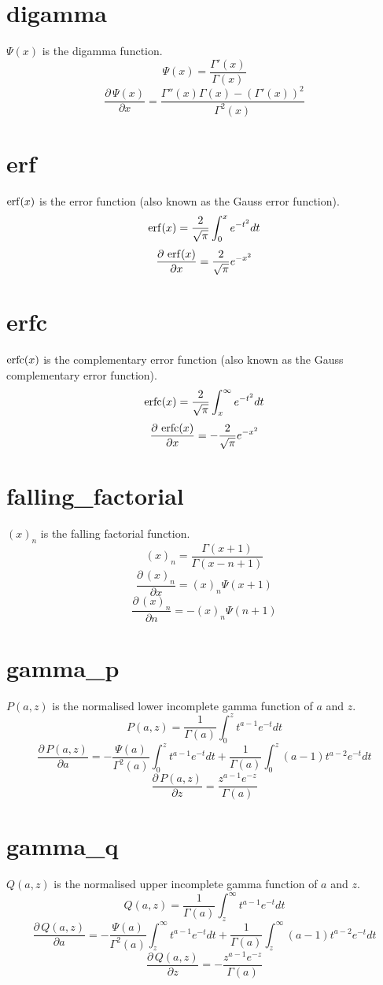 \section{digamma}\label{digamma-appendix.section}
$\Psi(x)$ is the digamma function.
%
\[
\Psi(x)=\frac{\Gamma'(x)}{\Gamma(x)}
\]
%
\[
\frac{\partial \, \Psi(x)}{\partial x} = \frac{\Gamma''(x)\Gamma(x)-(\Gamma'(x))^2}{\Gamma^2(x)}
\]

\section{erf}\label{erf-appendix.section}
$\erf(x)$ is the error function (also known as the Gauss error function).
%
\[
\erf(x)=\frac{2}{\sqrt{\pi}}\int_0^x e^{-t^2}dt
\]
%
\[
\frac{\partial \, \erf(x)}{\partial x} = \frac{2}{\sqrt{\pi}} e^{-x^2}
\]

\section{erfc}\label{erfc-appendix.section}
$\erfc(x)$ is the complementary error function (also known as the Gauss complementary error function).
%
\[
\erfc(x)=\frac{2}{\sqrt{\pi}}\int_x^\infty e^{-t^2}dt
\]
%
\[
\frac{\partial \, \erfc(x)}{\partial x} = -\frac{2}{\sqrt{\pi}} e^{-x^2}
\]

\section{falling\_factorial}\label{falling-factorial-appendix.section}
$(x)_n$ is the falling factorial function.
%
\[
(x)_n=\frac{\Gamma(x+1)}{\Gamma(x-n+1)}
\]
%
\[
\frac{\partial \, (x)_n}{\partial x} = (x)_n\Psi(x+1)
\]
%
\[
\frac{\partial \, (x)_n}{\partial n} = -(x)_n\Psi(n+1)
\]

\section{gamma\_p}\label{gamma-p-appendix.section}
$P(a,z)$ is the normalised lower incomplete gamma function of $a$ and $z$.
%
\[
P(a,z)=\frac{1}{\Gamma(a)}\int_0^zt^{a-1}e^{-t}dt
\]
%
\[
\frac{\partial \, P(a,z)}{\partial a} = -\frac{\Psi(a)}{\Gamma^2(a)}\int_0^zt^{a-1}e^{-t}dt 
	+ \frac{1}{\Gamma(a)}\int_0^z (a-1)t^{a-2}e^{-t}dt
\]
%
\[
\frac{\partial \, P(a,z)}{\partial z} = \frac{z^{a-1}e^{-z}}{\Gamma(a)}
\]

\section{gamma\_q}\label{gamma-q-appendix.section}
$Q(a,z)$ is the normalised upper incomplete gamma function of $a$ and $z$.
%
\[
Q(a,z)=\frac{1}{\Gamma(a)}\int_z^\infty t^{a-1}e^{-t}dt
\]
%
\[
\frac{\partial \, Q(a,z)}{\partial a} = -\frac{\Psi(a)}{\Gamma^2(a)}\int_z^\infty t^{a-1}e^{-t}dt 
	+ \frac{1}{\Gamma(a)}\int_z^\infty (a-1)t^{a-2}e^{-t}dt
\]
%
\[
\frac{\partial \, Q(a,z)}{\partial z} = -\frac{z^{a-1}e^{-z}}{\Gamma(a)}
\]


